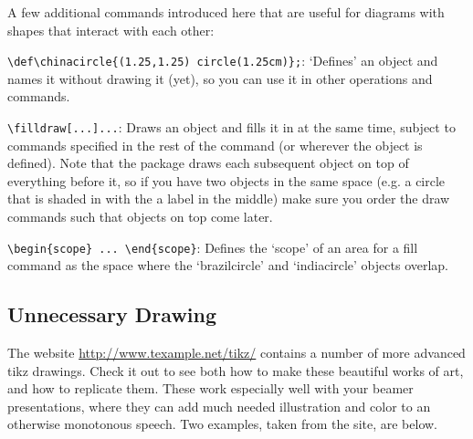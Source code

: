 \documentclass[10.5pt]{article}
\begin{document}
A few additional commands introduced here that are useful for diagrams with shapes that interact with each other: \\

\begin{compactitem}
\item \verb+\def\chinacircle{(1.25,1.25) circle(1.25cm)};+: `Defines' an object and names it without drawing it (yet), so you can use it in other operations and commands.
\item \verb+\filldraw[...]...+: Draws an object and fills it in at the same time, subject to commands specified in the rest of the command (or wherever the object is defined).  Note that the package draws each subsequent object on top of everything before it, so if you have two objects in the same space (e.g. a circle that is shaded in with the a label in the middle) make sure you order the draw commands such that objects on top come later.
\item \verb+\begin{scope} ... \end{scope}+: Defines the `scope' of an area for a fill command as the space where the `brazilcircle' and `indiacircle' objects overlap.\\
\end{compactitem}

\clearpage

\subsection*{Unnecessary Drawing}

	The website \href{http://www.texample.net/tikz/}{http://www.texample.net/tikz/} contains a number of more advanced tikz drawings. Check it out to see both how to make these beautiful works of art, and how to replicate them. These work especially well with your beamer presentations, where they can add much needed illustration and color to an otherwise monotonous speech. Two examples, taken from the site, are below.
\end{document}
